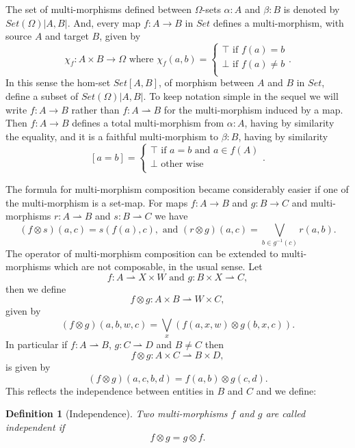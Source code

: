 \documentclass[oribibl]{llncs}
\newtheorem{defn}{Definition}
\begin{document}
The set of multi-morphisms defined between $\Omega$-sets $\alpha:A$ and $\beta:B$ is denoted by $Set(\Omega)|A,B|$. And, every map $f:A\rightarrow B$ in $Set$ defines a multi-morphism, with source $A$ and target $B$, given by
\[
\chi_f:A\times B\rightarrow\Omega \text{ where } \chi_f(a,b)=
\left\{
  \begin{array}{l}
    \top \text{ if } f(a)=b\\
    \bot \text{ if } f(a)\neq b\\
  \end{array}
\right..
\]
In this sense the hom-set $Set[A,B]$, of morphism between $A$ and $B$ in $Set$, define a subset of $Set(\Omega)|A,B|$. To keep notation simple in the sequel we will write $f:A\rightarrow B$ rather than $f:A\rightharpoonup B$ for the multi-morphism induced by a map. Then $f:A\rightarrow B$ defines a total multi-morphism from $\alpha:A$, having by similarity the equality, and it is a faithful multi-morphism to $\beta:B$, having by similarity
\[
[a=b]=
\left\{
  \begin{array}{l}
    \top \text{ if } a=b \text{ and }a\in f(A)\\
    \bot \text{ other wise}\\
  \end{array}
\right..
\]

The formula for multi-morphism composition became considerably easier if one of the multi-morphism is a set-map. For maps $f:A\rightarrow B$ and $g:B\rightarrow C$ and multi-morphisms $r:A\rightharpoonup B$ and $s:B\rightharpoonup C$ we have
\[
(f\otimes s)(a,c)=s(f(a),c),\text{ and }(r\otimes g)(a,c)=\bigvee_{b\in g^{-1}(c)}r(a,b).
\]
The operator of multi-morphism composition can be extended to multi-morphisms which are not composable, in the usual sense. Let
\[
f:A\rightharpoonup X\times W \text{ and } g:B\times X \rightharpoonup C,
\]
then we define
\[ f\otimes g:A\times B\rightharpoonup W\times C,\]
given by
\[
(f\otimes g)(a,b,w,c)=\bigvee_x(f(a,x,w)\otimes g(b,x,c)).
\]
In particular if $f:A\rightharpoonup B$, $g:C \rightharpoonup D$ and $B\neq C$ then \[f\otimes g:A\times C\rightharpoonup B\times D,\] is given by \[(f\otimes g)(a,c,b,d)=f(a,b)\otimes g(c,d).\] This reflects the independence between entities in $B$ and $C$ and we define:

\begin{defn}[Independence]
Two multi-morphisms $f$ and $g$ are called independent if
\[f\otimes g=g\otimes f.\]
\end{defn}
\end{document}
